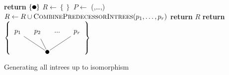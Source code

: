 

\begin{algorithm}
  \begin{algorithmic}[5]
     
        \State \textbf{return} $\left\{ \tikz{\fill(0,0) circle (0.1cm);} \right\}$ 
      \EndIf
      \State $R \gets \left\{  \right\}$ 
          \label{alg:huge-for-loop-in-tree-generation}
        \State $P \gets$ (,\dots,) 
           
          \State $R \gets R \cup \Call{CombinePredecessorIntrees}{p_1,\dots,p_r}$
          \EndIf
        \EndFor
      \EndFor
      \State \textbf{return} $R$
    \EndProcedure
    \Statex
    \State \textbf{return} $\left\{
      \tikz[baseline=(current bounding box.center)]{
        \fill (-0.5,0)circle(0.1cm);
        \node(root) at (-0.5,0){};
        \node[circle](1) at (-2,1) {$p_1$};
        \node[circle](2) at (-1,1) {$p_2$};
        \node[circle](p) at (0,1) {...};
        \node[circle](r) at (1,1) {$p_r$};
        \draw[-] (1) -- (root);
        \draw[-] (2) -- (root);
        \draw[-] (r) -- (root);
      }
      \right\} $
    \EndProcedure
  \end{algorithmic}
  \caption{Generating all intrees up to isomorphism}
  \label{alg:generate-intrees}
\end{algorithm}


